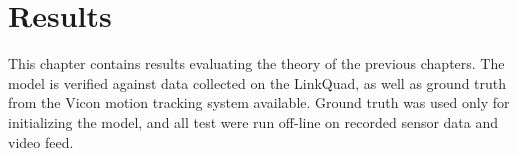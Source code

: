 \chapter{Results}
\label{cha:results}
    This chapter contains results evaluating the theory of the previous chapters.
    The model is verified against data collected on the LinkQuad, as well
    as ground truth from the Vicon motion tracking system available.
    Ground truth was used only for initializing the model, and all test
    were run off-line on recorded sensor data and video feed.

    
    
    
    
    
